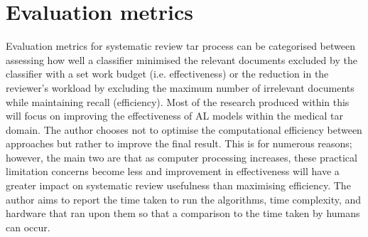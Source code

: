 \documentclass[10pt,oneside]{book}
\begin{document}


\section{Evaluation metrics}
Evaluation metrics for systematic review \gls*{tar} process can be categorised between assessing how well a classifier minimised the relevant documents excluded by the classifier with a set work budget (i.e. effectiveness) or the reduction in the reviewer's workload by excluding the maximum number of irrelevant documents while maintaining recall (efficiency).  Most of the research produced within this will focus on improving the effectiveness of AL models within the medical \gls*{tar} domain. The author chooses not to optimise the computational efficiency between approaches but rather to improve the final result. This is for numerous reasons; however, the main two are that as computer processing increases, these practical limitation concerns become less and improvement in effectiveness will have a greater impact on systematic review usefulness than maximising efficiency.  The author aims to report the time taken to run the algorithms, time complexity, and hardware that ran upon them so that a comparison to the time taken by humans can occur.
\end{document}

